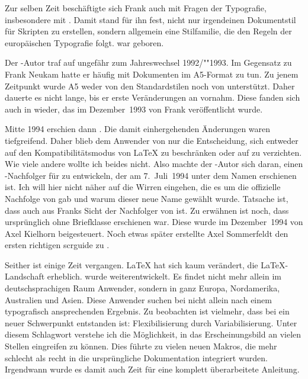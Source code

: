   Zur selben Zeit beschäftigte sich Frank auch mit Fragen der
  Typografie, insbesondere mit \cite{JTsch87}. Damit stand für ihn
  fest, nicht nur irgendeinen Dokumentstil für Skripten zu erstellen,
  sondern allgemein eine Stilfamilie, die den Regeln der europäischen
  Typografie folgt. {\Script} war geboren.

  Der \KOMAScript-Autor traf auf {\Script} ungefähr zum Jahreswechsel
  1992/""1993. Im Gegensatz zu Frank Neukam hatte er häufig mit Dokumenten im
  A5-Format zu tun. Zu jenem Zeitpunkt wurde A5 weder von den Standardstilen
  noch von {\Script} unterstützt. Daher dauerte es nicht lange, bis er erste
  Veränderungen an {\Script} vornahm. Diese fanden sich auch in {\ScriptII}
  wieder, das im Dezember~1993 von Frank veröffentlicht wurde.

  Mitte 1994 erschien dann \LaTeXe. Die damit einhergehenden Änderungen waren
  tiefgreifend. Daher blieb dem Anwender von {\ScriptII} nur die Entscheidung,
  sich entweder auf den Kompatibilitätsmodus von \LaTeX{} zu beschränken oder
  auf {\Script} zu verzichten. Wie viele andere wollte ich beides nicht. Also
  machte der \KOMAScript-Autor sich daran, einen \Script-Nachfolger für
  {\LaTeXe} zu entwickeln, der am 7.~Juli~1994 unter dem Namen {\KOMAScript}
  erschienen ist. Ich will hier nicht näher auf die Wirren eingehen, die es um
  die offizielle Nachfolge von {\Script} gab und warum dieser neue Name
  gewählt wurde. Tatsache ist, dass auch aus Franks Sicht {\KOMAScript} der
  Nachfolger von {\ScriptII} ist. Zu erwähnen ist noch, dass {\KOMAScript}
  ursprünglich ohne Briefklasse erschienen war. Diese wurde im Dezember~1994
  von Axel Kielhorn beigesteuert. Noch etwas später erstellte Axel Sommerfeldt
  den ersten richtigen scrguide zu {\KOMAScript}.

  Seither ist einige Zeit vergangen. {\LaTeX} hat sich kaum verändert, die
  \LaTeX-Landschaft erheblich. {\KOMAScript} wurde weiterentwickelt. Es findet
  nicht mehr allein im deutschsprachigen Raum Anwender, sondern in ganz
  Europa, Nordamerika, Australien und Asien.  Diese Anwender suchen bei
  {\KOMAScript} nicht allein nach einem typografisch ansprechenden
  Ergebnis. Zu beobachten ist vielmehr, dass bei {\KOMAScript} ein neuer
  Schwerpunkt entstanden ist: Flexibilisierung durch Variabilisierung. Unter
  diesem Schlagwort verstehe ich die Möglichkeit, in das Erscheinungsbild an
  vielen Stellen eingreifen zu können. Dies führte zu vielen neuen Makros, die
  mehr schlecht als recht in die ursprüngliche Dokumentation integriert wurden.
  Irgendwann wurde es damit auch Zeit für eine komplett überarbeitete
  Anleitung.


